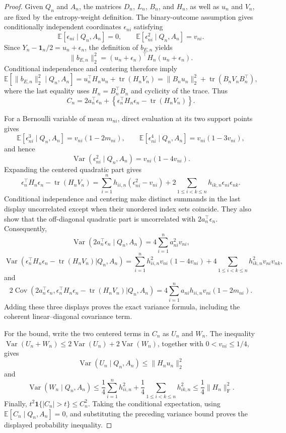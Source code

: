 \documentclass{article}
\begin{document}
\begin{proof}
Given \(Q_n\) and \(A_n\), the matrices \(D_n\), \(L_n\), \(B_n\), and \(H_n\), as well as \(u_n\) and \(V_n\), are fixed by the entropy-weight definition.  The binary-outcome assumption gives conditionally independent coordinates \(\epsilon_{ni}\) satisfying
\[
 \mathbb E[\epsilon_{ni}\mid Q_n,A_n]=0,
 \qquad
 \mathbb E[\epsilon_{ni}^2\mid Q_n,A_n]=v_{ni}.
\]
Since \(Y_n-\mathbf 1_n/2=u_n+\epsilon_n\), the definition of \(b_{E,n}\) yields
\[
 \|b_{E,n}\|_2^2
 =(u_n+\epsilon_n)^{\top}H_n(u_n+\epsilon_n).
\]
Conditional independence and centering therefore imply
\[
 \mathbb E[\|b_{E,n}\|_2^2\mid Q_n,A_n]
 =u_n^{\top}H_nu_n+\operatorname{tr}(H_nV_n)
 =\|B_nu_n\|_2^2+\operatorname{tr}(B_nV_nB_n^{\top}),
\]
where the last equality uses \(H_n=B_n^{\top}B_n\) and cyclicity of the trace.  Thus
\[
 C_n=2a_n^{\top}\epsilon_n+
 \left\{\epsilon_n^{\top}H_n\epsilon_n-\operatorname{tr}(H_nV_n)\right\}.
\]

For a Bernoulli variable of mean \(m_{ni}\), direct evaluation at its two support points gives
\[
 \mathbb E[\epsilon_{ni}^3\mid Q_n,A_n]
 =v_{ni}(1-2m_{ni}),
 \qquad
 \mathbb E[\epsilon_{ni}^4\mid Q_n,A_n]
 =v_{ni}(1-3v_{ni}),
\]
and hence
\[
 \operatorname{Var}(\epsilon_{ni}^2\mid Q_n,A_n)
 =v_{ni}(1-4v_{ni}).
\]
Expanding the centered quadratic part gives
\[
 \epsilon_n^{\top}H_n\epsilon_n-\operatorname{tr}(H_nV_n)
 =\sum_{i=1}^nh_{ii,n}(\epsilon_{ni}^2-v_{ni})
 +2\sum_{1\le i<k\le n}h_{ik,n}\epsilon_{ni}\epsilon_{nk}.
\]
Conditional independence and centering make distinct summands in the last display uncorrelated except when their unordered index sets coincide.  They also show that the off-diagonal quadratic part is uncorrelated with \(2a_n^{\top}\epsilon_n\).  Consequently,
\[
 \operatorname{Var}(2a_n^{\top}\epsilon_n\mid Q_n,A_n)
 =4\sum_{i=1}^na_{ni}^2v_{ni},
\]
\[
 \operatorname{Var}\!\left(
 \epsilon_n^{\top}H_n\epsilon_n-\operatorname{tr}(H_nV_n)
 \mathrel{\big|}Q_n,A_n\right)
 =\sum_{i=1}^nh_{ii,n}^2v_{ni}(1-4v_{ni})
 +4\sum_{1\le i<k\le n}h_{ik,n}^2v_{ni}v_{nk},
\]
and
\[
 2\operatorname{Cov}\!\left(
 2a_n^{\top}\epsilon_n,
 \epsilon_n^{\top}H_n\epsilon_n-\operatorname{tr}(H_nV_n)
 \mathrel{\big|}Q_n,A_n\right)
 =4\sum_{i=1}^na_{ni}h_{ii,n}v_{ni}(1-2m_{ni}).
\]
Adding these three displays proves the exact variance formula, including the coherent linear--diagonal covariance term.

For the bound, write the two centered terms in \(C_n\) as \(U_n\) and \(W_n\).  The inequality \(\operatorname{Var}(U_n+W_n)\le2\operatorname{Var}(U_n)+2\operatorname{Var}(W_n)\), together with \(0<v_{ni}\le1/4\), gives
\[
 \operatorname{Var}(U_n\mid Q_n,A_n)\le\|H_nu_n\|_2^2
\]
and
\[
 \operatorname{Var}(W_n\mid Q_n,A_n)
 \le\frac14\sum_{i=1}^nh_{ii,n}^2
    +\frac14\sum_{1\le i<k\le n}h_{ik,n}^2
 \le\frac14\|H_n\|_{\mathrm F}^2.
\]
Finally, \(t^2\mathbf 1\{|C_n|>t\}\le C_n^2\).  Taking the conditional expectation, using \(\mathbb E[C_n\mid Q_n,A_n]=0\), and substituting the preceding variance bound proves the displayed probability inequality.
\end{proof}
\end{document}
